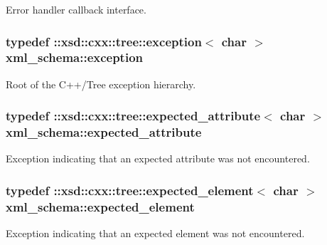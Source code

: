 Error handler callback interface. 

\hypertarget{namespacexml__schema_a7eb0fa6af3de36ea17011d26a731b62b}{}
\subsubsection[{exception}]{\setlength{\rightskip}{0pt plus 5cm}typedef \+::xsd\+::cxx\+::tree\+::exception$<$ char $>$ {\bf xml\+\_\+schema\+::exception}}\label{namespacexml__schema_a7eb0fa6af3de36ea17011d26a731b62b}


Root of the C++/\+Tree exception hierarchy. 

\hypertarget{namespacexml__schema_ad8a9d3a09372da61ab6ba78c4de87a26}{}
\subsubsection[{expected\+\_\+attribute}]{\setlength{\rightskip}{0pt plus 5cm}typedef \+::xsd\+::cxx\+::tree\+::expected\+\_\+attribute$<$ char $>$ {\bf xml\+\_\+schema\+::expected\+\_\+attribute}}\label{namespacexml__schema_ad8a9d3a09372da61ab6ba78c4de87a26}


Exception indicating that an expected attribute was not encountered. 

\hypertarget{namespacexml__schema_a4b608c951db27c574552da0bda062e1a}{}
\subsubsection[{expected\+\_\+element}]{\setlength{\rightskip}{0pt plus 5cm}typedef \+::xsd\+::cxx\+::tree\+::expected\+\_\+element$<$ char $>$ {\bf xml\+\_\+schema\+::expected\+\_\+element}}\label{namespacexml__schema_a4b608c951db27c574552da0bda062e1a}


Exception indicating that an expected element was not encountered. 

\hypertarget{namespacexml__schema_a1994323b3f5fee8db7891f02bb9144b9}{}
